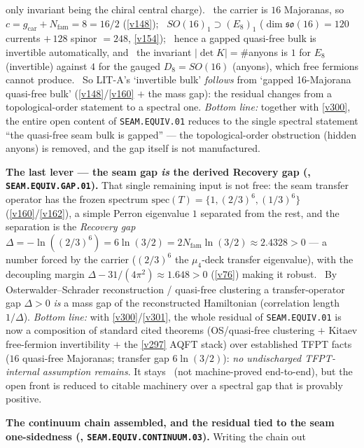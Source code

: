 \documentclass[11pt,a4paper]{article}
\newcommand{\Nfam}{N_{\mathrm{fam}}}
\begin{document}
\begin{keybox}
only invariant being the chiral central charge). \mE\ the carrier is $16$ Majoranas, so
$c=g_{\mathrm{car}}{+}\Nfam=8=16/2$ (\vref{v148}); \mE\ $SO(16)_1\supset(E_8)_1$ ($\dim\mathfrak{so}(16)=120$
currents $+\,128$ spinor $=248$, \vref{v154}); \mC\ hence a gapped quasi-free bulk is invertible
automatically, and \mE\ the invariant $|\det K|=\#$anyons is $1$ for $E_8$ (invertible) against $4$ for the
gauged $D_8{=}SO(16)$ (anyons), which free fermions cannot produce. \mO\ So LIT-A's `invertible bulk'
\emph{follows} from `gapped 16-Majorana quasi-free bulk' (\vref{v148}/\vref{v160} $+$ the mass gap): the
residual changes from a topological-order statement to a spectral one. \emph{Bottom line:} together with
\vref{v300}, the entire open content of \texttt{SEAM.EQUIV.01} reduces to the single spectral statement ``the
quasi-free seam bulk is gapped'' --- the topological-order obstruction (hidden anyons) is removed, and the gap
itself is not manufactured.
\par\smallskip\noindent\textbf{The last lever --- the seam gap \emph{is} the derived Recovery gap
(, \texttt{SEAM.EQUIV.GAP.01}).} That single remaining input is not free: the seam
transfer operator has the frozen spectrum $\mathrm{spec}(T)=\{1,(2/3)^6,(1/3)^6\}$ (\vref{v160}/\vref{v162}),
a simple Perron eigenvalue $1$ separated from the rest, and the separation is the \emph{Recovery gap}
$\Delta=-\ln((2/3)^6)=6\ln(3/2)=2\Nfam\ln(3/2)\approx2.4328>0$ --- a number forced by the carrier ($(2/3)^6$ the
$\mu_4$-deck transfer eigenvalue), with the decoupling margin $\Delta-31/(4\pi^2)\approx1.648>0$ (\vref{v76})
making it robust. \mC\ By Osterwalder--Schrader reconstruction / quasi-free clustering a transfer-operator gap
$\Delta>0$ \emph{is} a mass gap of the reconstructed Hamiltonian (correlation length $1/\Delta$). \emph{Bottom
line:} with \vref{v300}/\vref{v301}, the whole residual of \texttt{SEAM.EQUIV.01} is now a composition of standard
cited theorems (OS/quasi-free clustering $+$ Kitaev free-fermion invertibility $+$ the \vref{v297} AQFT stack)
over established TFPT facts ($16$ quasi-free Majoranas; transfer gap $6\ln(3/2)$): \emph{no undischarged
TFPT-internal assumption remains}. It stays \mO\ (not machine-proved end-to-end), but the open front is reduced
to citable machinery over a spectral gap that is provably positive.
\par\smallskip\noindent\textbf{The continuum chain assembled, and the residual tied to the seam one-sidedness
(, \texttt{SEAM.EQUIV.CONTINUUM.03}).} Writing the chain out

\end{keybox}
\end{document}
